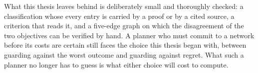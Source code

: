 What this thesis leaves behind is deliberately small and thoroughly checked: a classification whose every entry is carried by a proof or by a cited source, a criterion that reads it, and a five-edge graph on which the disagreement of the two objectives can be verified by hand.
A planner who must commit to a network before its costs are certain still faces the choice this thesis began with, between guarding against the worst outcome and guarding against regret.
What such a planner no longer has to guess is what either choice will cost to compute.
